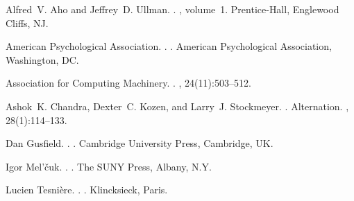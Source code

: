 \documentclass[11pt]{article}
\begin{document}
\begin{thebibliography}{}

Alfred~V. Aho and Jeffrey~D. Ullman.
.
, volume~1.
\newblock Prentice-{Hall}, Englewood Cliffs, NJ.

{American Psychological Association}.
.
.
\newblock American Psychological Association, Washington, DC.

{Association for Computing Machinery}.
.
, 24(11):503--512.

Ashok~K. Chandra, Dexter~C. Kozen, and Larry~J. Stockmeyer.
.
\newblock Alternation.
,
  28(1):114--133.

Dan Gusfield.
.
.
\newblock Cambridge University Press, Cambridge, UK.

Igor Mel'\v{c}uk.
.
.
\newblock The SUNY Press, Albany, N.Y.

Lucien Tesni\`{e}re.
.
.
\newblock Klincksieck, Paris.

\end{thebibliography}
\end{document}
